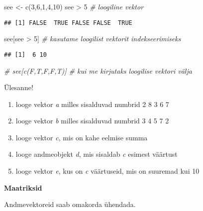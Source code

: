 \documentclass[
]{book}
\newenvironment{Shaded}{\begin{snugshade}}{\end{snugshade}}
\newcommand{\CommentTok}[1]{\textcolor[rgb]{0.56,0.35,0.01}{\textit{#1}}}
\newcommand{\DecValTok}[1]{\textcolor[rgb]{0.00,0.00,0.81}{#1}}
\newcommand{\FunctionTok}[1]{\textcolor[rgb]{0.00,0.00,0.00}{#1}}
\newcommand{\NormalTok}[1]{#1}
\newcommand{\OtherTok}[1]{\textcolor[rgb]{0.56,0.35,0.01}{#1}}
\newcommand{\SpecialCharTok}[1]{\textcolor[rgb]{0.00,0.00,0.00}{#1}}
\providecommand{\tightlist}{%
  \setlength{\itemsep}{0pt}\setlength{\parskip}{0pt}}
\begin{document}
\begin{Shaded}
\begin{Highlighting}[]
\NormalTok{see }\OtherTok{\textless{}{-}} \FunctionTok{c}\NormalTok{(}\DecValTok{3}\NormalTok{,}\DecValTok{6}\NormalTok{,}\DecValTok{1}\NormalTok{,}\DecValTok{4}\NormalTok{,}\DecValTok{10}\NormalTok{)}
\NormalTok{see }\SpecialCharTok{\textgreater{}} \DecValTok{5} \CommentTok{\# loogiline vektor}
\end{Highlighting}
\end{Shaded}

\begin{verbatim}
## [1] FALSE  TRUE FALSE FALSE  TRUE
\end{verbatim}

\begin{Shaded}
\begin{Highlighting}[]
\NormalTok{see[see }\SpecialCharTok{\textgreater{}} \DecValTok{5}\NormalTok{] }\CommentTok{\# kasutame loogilist vektorit indekseerimiseks}
\end{Highlighting}
\end{Shaded}

\begin{verbatim}
## [1]  6 10
\end{verbatim}

\begin{Shaded}
\begin{Highlighting}[]
\CommentTok{\# see[c(F,T,F,F,T)] \# kui me kirjutaks loogilise vektori välja}
\end{Highlighting}
\end{Shaded}

Ülesanne!

\begin{enumerate}
\def\labelenumi{\arabic{enumi}.}
\tightlist
\item
  looge vektor \emph{a} milles sisalduvad numbrid 2 8 3 6 7
\item
  looge vektor \emph{b} milles sisalduvad numbrid 3 4 5 7 2
\item
  looge vektor \emph{c}, mis on kahe eelmise summa
\item
  looge andmeobjekt \emph{d}, mis sisaldab \emph{c} esimest väärtust
\item
  looge vektor \emph{e}, kus on \emph{c} väärtuseid, mis on suuremad kui 10
\end{enumerate}

\textbf{Maatriksid}

Andmevektoreid saab omakorda ühendada.
\end{document}
